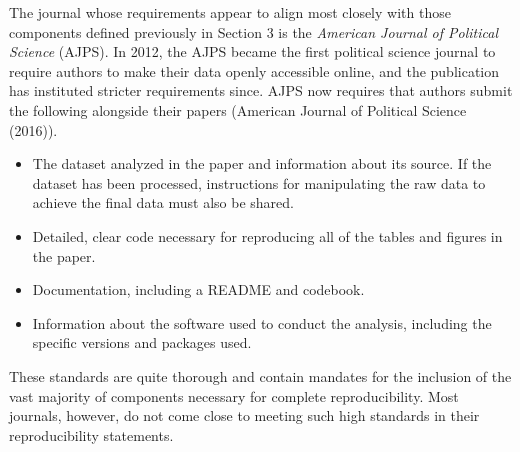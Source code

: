\documentclass[12pt,twoside]{reedthesis}
\providecommand{\tightlist}{%
  \setlength{\itemsep}{0pt}\setlength{\parskip}{0pt}}
\begin{document}
The journal whose requirements appear to align most closely with those
components defined previously in Section 3 is the \emph{American Journal
of Political Science} (AJPS). In 2012, the AJPS became the first
political science journal to require authors to make their data openly
accessible online, and the publication has instituted stricter
requirements since. AJPS now requires that authors submit the following
alongside their papers (American Journal of Political Science (2016)).
\begin{itemize}
\tightlist
\item
  The dataset analyzed in the paper and information about its source. If
  the dataset has been processed, instructions for manipulating the raw
  data to achieve the final data must also be shared.
\item
  Detailed, clear code necessary for reproducing all of the tables and
  figures in the paper.
\item
  Documentation, including a README and codebook.
\item
  Information about the software used to conduct the analysis, including
  the specific versions and packages used.
\end{itemize}
These standards are quite thorough and contain mandates for the
inclusion of the vast majority of components necessary for complete
reproducibility. Most journals, however, do not come close to meeting
such high standards in their reproducibility statements.
\end{document}

